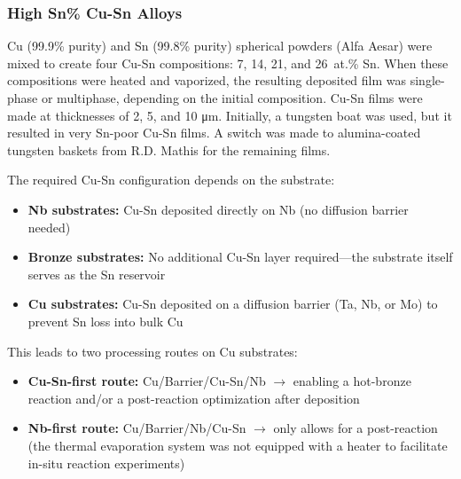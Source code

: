 
    \subsubsection{High Sn\% Cu-Sn Alloys}

    Cu (99.9\% purity) and Sn (99.8\% purity) spherical powders (Alfa Aesar) were mixed to create four Cu-Sn compositions: 7, 14, 21, and 26~at.\% Sn. When these compositions were heated and vaporized, the resulting deposited film was single-phase or multiphase, depending on the initial composition. Cu-Sn films were made at thicknesses of 2, 5, and 10 \unit{\um}. Initially, a tungsten boat was used, but it resulted in very Sn-poor Cu-Sn films. A switch was made to alumina-coated tungsten baskets from R.D. Mathis for the remaining films. 
    
    \noindent The required Cu-Sn configuration depends on the substrate:
    
    \begin{itemize}
        \item \textbf{Nb substrates:} Cu-Sn deposited directly on Nb (no diffusion barrier needed)
        \item \textbf{Bronze substrates:} No additional Cu-Sn layer required---the substrate itself serves as the Sn reservoir  
        \item \textbf{Cu substrates:} Cu-Sn deposited on a diffusion barrier (Ta, Nb, or Mo) to prevent Sn loss into bulk Cu
    \end{itemize}
    
    \noindent This leads to two processing routes on Cu substrates:
    
    \begin{itemize}
        \item \textbf{Cu-Sn-first route:} Cu/Barrier/Cu-Sn/Nb $\rightarrow$ enabling a hot-bronze reaction and/or a post-reaction optimization after deposition
        \item \textbf{Nb-first route:} Cu/Barrier/Nb/Cu-Sn $\rightarrow$ only allows for a post-reaction (the thermal evaporation system was not equipped with a heater to facilitate in-situ reaction experiments)
    \end{itemize}
  
